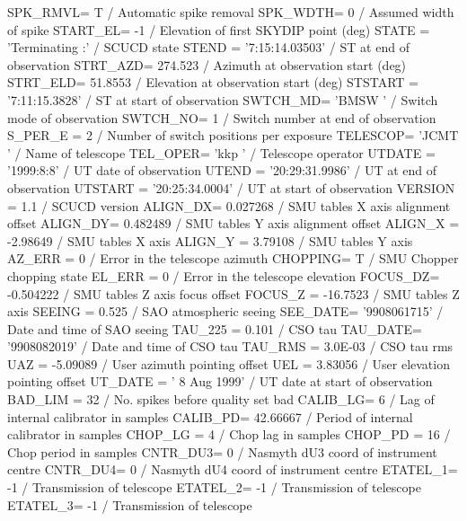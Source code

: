 \documentclass[twoside,11pt,nolof]{starlink}
\begin{document}
\begin{small}
\begin{terminalv}
SPK_RMVL=                    T / Automatic spike removal
SPK_WDTH=                    0 / Assumed width of spike
START_EL=                   -1 / Elevation of first SKYDIP point (deg)
STATE   = 'Terminating         :' / SCUCD state
STEND   = '7:15:14.03503'      / ST at end of observation
STRT_AZD=              274.523 / Azimuth at observation start (deg)
STRT_ELD=              51.8553 / Elevation at observation start (deg)
STSTART = '7:11:15.3828'       / ST at start of observation
SWTCH_MD= 'BMSW    '           / Switch mode of observation
SWTCH_NO=                    1 / Switch number at end of observation
S_PER_E =                    2 / Number of switch positions per exposure
TELESCOP= 'JCMT    '           / Name of telescope
TEL_OPER= 'kkp     '           / Telescope operator
UTDATE  = '1999:8:8'           / UT date of observation
UTEND   = '20:29:31.9986'      / UT at end of observation
UTSTART = '20:25:34.0004'      / UT at start of observation
VERSION =                  1.1 / SCUCD version
ALIGN_DX=             0.027268 / SMU tables X axis alignment offset
ALIGN_DY=             0.482489 / SMU tables Y axis alignment offset
ALIGN_X =             -2.98649 / SMU tables X axis
ALIGN_Y =              3.79108 / SMU tables Y axis
AZ_ERR  =                    0 / Error in the telescope azimuth
CHOPPING=                    T / SMU Chopper chopping state
EL_ERR  =                    0 / Error in the telescope elevation
FOCUS_DZ=            -0.504222 / SMU tables Z axis focus offset
FOCUS_Z =             -16.7523 / SMU tables Z axis
SEEING  =                0.525 / SAO atmospheric seeing
SEE_DATE= '9908061715'         / Date and time of SAO seeing
TAU_225 =                0.101 / CSO tau
TAU_DATE= '9908082019'         / Date and time of CSO tau
TAU_RMS =              3.0E-03 / CSO tau rms
UAZ     =             -5.09089 / User azimuth pointing offset
UEL     =              3.83056 / User elevation pointing offset
UT_DATE = ' 8 Aug 1999'        / UT date at start of observation
BAD_LIM =                   32 / No. spikes before quality set bad
CALIB_LG=                    6 / Lag of internal calibrator in samples
CALIB_PD=             42.66667 / Period of internal calibrator in samples
CHOP_LG =                    4 / Chop lag in samples
CHOP_PD =                   16 / Chop period in samples
CNTR_DU3=                    0 / Nasmyth dU3 coord of instrument centre
CNTR_DU4=                    0 / Nasmyth dU4 coord of instrument centre
ETATEL_1=                   -1 / Transmission of telescope
ETATEL_2=                   -1 / Transmission of telescope
ETATEL_3=                   -1 / Transmission of telescope

\end{terminalv}
\end{small}
\end{document}
